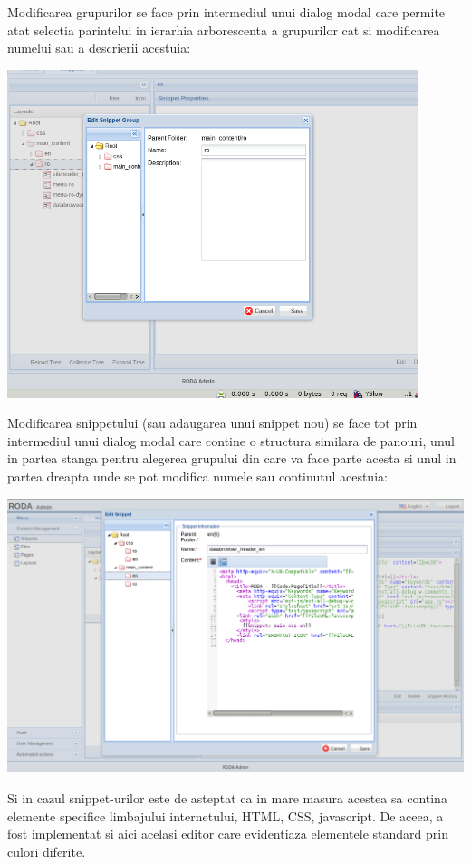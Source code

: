 Modificarea grupurilor se face prin intermediul unui dialog modal
care permite atat selectia parintelui in ierarhia arborescenta a grupurilor
cat si modificarea numelui sau a descrierii acestuia:

\includegraphics[width=12cm]{cms/backend/snippet/snippet2}

Modificarea snippetului (sau adaugarea unui snippet nou) se face tot
prin intermediul unui dialog modal care contine o structura similara
de panouri, unul in partea stanga pentru alegerea grupului din care
va face parte acesta si unul in partea dreapta unde se pot modifica
numele sau continutul acestuia:

\includegraphics[width=15cm]{cms/backend/snippet/snippet3}

Si in cazul snippet-urilor este de asteptat ca in mare masura acestea
sa contina elemente specifice limbajului internetului, HTML, CSS,
javascript. De aceea, a fost implementat si aici acelasi editor care
evidentiaza elementele standard prin culori diferite. 

